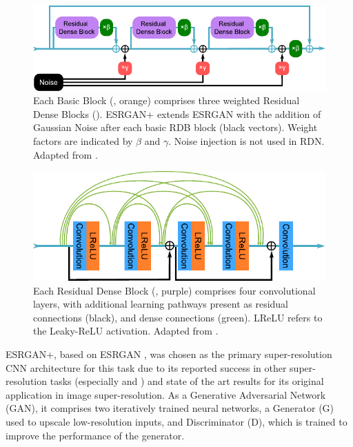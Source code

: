 \begin{figure}[hbtp]
    \centering
    \includegraphics[width=\linewidth]{fig/p1/rdb_vec.pdf}
    \caption[Basic blocks]{Each Basic Block (, orange) comprises three weighted Residual Dense Blocks ().
        ESRGAN+ extends ESRGAN with the addition of Gaussian Noise after each basic RDB block (black vectors).
        Weight factors are indicated by \(\beta{}\) and \(\gamma{}\).
        Noise injection is not used in RDN\@.
        Adapted from \textcite{rakotonirinaESRGANFurtherImproving2020}.
    }
    \label{fig:rdb}
\end{figure}

\begin{figure}[hbtp]
    \centering
    \includegraphics[width=0.75\linewidth]{fig/p1/convs_vec.pdf}
    \caption[RDB convolutional layers]{Each Residual Dense Block (, purple) comprises four convolutional layers, with additional learning pathways present as residual connections (black), and dense connections (green). LReLU refers to the Leaky-ReLU activation. Adapted from \textcite{rakotonirinaESRGANFurtherImproving2020}.}
    \label{fig:convs}
\end{figure}


ESRGAN+, based on ESRGAN \parencite{wangESRGANEnhancedSuperresolution2018}, was chosen as the primary super-resolution CNN architecture for this task due to its reported success in other super-resolution tasks (especially \textcite{bodeUsingPhysicsinformedEnhanced2021} and \textcite{leongDeepBedMapDeepNeural2020}) and state of the art results for its original application in image super-resolution.
As a Generative Adversarial Network (GAN), it comprises two iteratively trained neural networks, a Generator (G) used to upscale low-resolution inputs, and Discriminator (D), which is trained to improve the performance of the generator.

